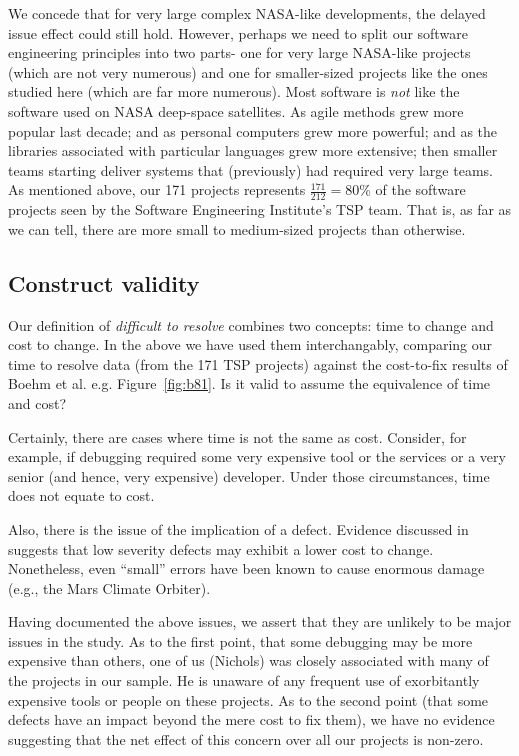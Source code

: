 \documentclass{sig-alternate}
\newcommand{\fig}[1]{Figure~\ref{fig:#1}}
\begin{document}
We concede that for very large complex NASA-like developments, the delayed issue
effect could still hold. However, perhaps we need to split our software engineering principles
into two parts- one for   very large NASA-like projects (which are not very numerous)
and one for smaller-sized projects like the ones studied here (which are far more numerous).
Most software is {\em not} like the software used on NASA deep-space satellites.
As  agile methods grew more popular last decade; and as personal computers grew more powerful;
and as the libraries associated with particular languages grew more extensive; then smaller
teams starting  deliver systems that (previously) had required very large teams.
As mentioned above,
our  171 projects represents $\frac{171}{212}=80$\% of the software projects
seen by the Software Engineering Institute's TSP team.
That is, as far as we can tell,
there are more small to medium-sized projects than otherwise.



\subsection{Construct validity} 

Our definition of {\em difficult to resolve} combines two concepts: time to change and cost to
change. In the above we have used them interchangably, comparing our time to resolve data (from the 171 TSP projects) against the cost-to-fix results of Boehm et al. e.g. \fig{b81}.
Is it valid to assume the equivalence of time and cost?

Certainly, there are cases where time is not the same as cost. Consider, for example,
if debugging required some very expensive tool or the services or a very senior (and hence, very expensive)
developer. Under those circumstances, time does not equate to cost.

Also, there is the issue of the implication of  a defect. Evidence discussed in \cite{Shull02} suggests that low severity defects may exhibit a lower cost to change. Nonetheless, even ``small'' errors have been known to cause enormous damage (e.g., the Mars Climate Orbiter). 

Having documented the above issues, we assert that they are unlikely to be major issues in the study.
As to the first point, that some debugging may be more expensive than others, one of us (Nichols)
was closely associated with many of the projects in our sample. He is unaware of any frequent
use of exorbitantly expensive tools or people on these projects. As to the second point (that
some defects have an impact beyond the mere cost to fix them), we have no evidence suggesting
that the net effect of this concern over all our projects is non-zero.
\end{document}
